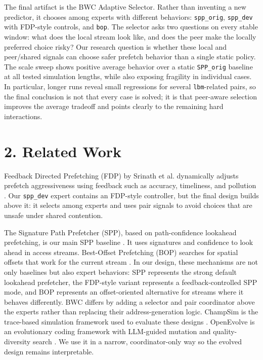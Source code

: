 \documentclass[10pt,letterpaper]{article}
\newcommand{\code}[1]{\texttt{#1}}
\begin{document}
The final artifact is the BWC Adaptive Selector. Rather than inventing a new
predictor, it chooses among experts with different behaviors: \code{spp\_orig},
\code{spp\_dev} with FDP-style controls, and \code{bop}. The selector asks two
questions on every stable window: what does the local stream look like, and
does the peer make the locally preferred choice risky? Our research question is
whether these local and peer/shared signals can choose safer prefetch behavior
than a single static policy. The scale sweep shows positive average behavior
over a static \code{SPP\_orig} baseline at all tested simulation lengths, while
also exposing fragility in individual cases. In particular, longer runs reveal
small regressions for several \code{lbm}-related pairs, so the final conclusion is
not that every case is solved; it is that peer-aware selection improves the
average tradeoff and points clearly to the remaining hard interactions.

\section*{2. Related Work}

Feedback Directed Prefetching (FDP) by Srinath et al. dynamically adjusts
prefetch aggressiveness using feedback such as accuracy, timeliness, and
pollution \cite{fdp}. Our \code{spp\_dev} expert contains an FDP-style
controller, but the final design builds above it: it selects among experts and
uses pair signals to avoid choices that are unsafe under shared contention.

The Signature Path Prefetcher (SPP), based on path-confidence lookahead
prefetching, is our main SPP baseline \cite{spp}. It uses signatures and
confidence to look ahead in access streams. Best-Offset Prefetching (BOP)
searches for spatial offsets that work for the current stream \cite{bop}. In
our design, these mechanisms are not only baselines but also expert behaviors:
SPP represents the strong default lookahead prefetcher, the FDP-style variant
represents a feedback-controlled SPP mode, and BOP represents an offset-oriented
alternative for streams where it behaves differently. BWC differs by adding a
selector and pair coordinator above the experts rather than replacing their
address-generation logic. ChampSim is the trace-based simulation framework used
to evaluate these designs \cite{champsim}. OpenEvolve is an evolutionary coding
framework with LLM-guided mutation and quality-diversity search
\cite{openevolve}. We use it in a narrow, coordinator-only way so the evolved
design remains interpretable.
\end{document}
